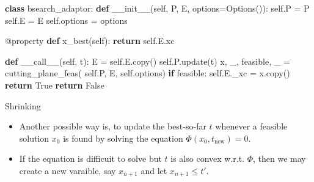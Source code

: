 \documentclass[
  ignorenonframetext,
  aspectratio=169,
  serif,onlymath]{beamer}
\newenvironment{Shaded}{}{}
\newcommand{\AttributeTok}[1]{\textcolor[rgb]{0.49,0.56,0.16}{#1}}
\newcommand{\ControlFlowTok}[1]{\textcolor[rgb]{0.00,0.44,0.13}{\textbf{#1}}}
\newcommand{\FunctionTok}[1]{\textcolor[rgb]{0.02,0.16,0.49}{#1}}
\newcommand{\KeywordTok}[1]{\textcolor[rgb]{0.00,0.44,0.13}{\textbf{#1}}}
\newcommand{\NormalTok}[1]{#1}
\newcommand{\OperatorTok}[1]{\textcolor[rgb]{0.40,0.40,0.40}{#1}}
\newcommand{\VariableTok}[1]{\textcolor[rgb]{0.10,0.09,0.49}{#1}}
\begin{document}
\begin{frame}[fragile]

\scriptsize

\begin{Shaded}
\begin{Highlighting}[]
\KeywordTok{class}\NormalTok{ bsearch_adaptor:}
    \KeywordTok{def} \FunctionTok{__init__}\NormalTok{(}\VariableTok{self}\NormalTok{, P, E, options}\OperatorTok{=}\NormalTok{Options()):}
        \VariableTok{self}\NormalTok{.P }\OperatorTok{=}\NormalTok{ P}
        \VariableTok{self}\NormalTok{.E }\OperatorTok{=}\NormalTok{ E}
        \VariableTok{self}\NormalTok{.options }\OperatorTok{=}\NormalTok{ options}

    \AttributeTok{@property}
    \KeywordTok{def}\NormalTok{ x_best(}\VariableTok{self}\NormalTok{):}
        \ControlFlowTok{return} \VariableTok{self}\NormalTok{.E.xc}

    \KeywordTok{def} \FunctionTok{__call__}\NormalTok{(}\VariableTok{self}\NormalTok{, t):}
\NormalTok{        E }\OperatorTok{=} \VariableTok{self}\NormalTok{.E.copy()}
        \VariableTok{self}\NormalTok{.P.update(t)}
\NormalTok{        x, _, feasible, _ }\OperatorTok{=}\NormalTok{ cutting_plane_feas(}
            \VariableTok{self}\NormalTok{.P, E, }\VariableTok{self}\NormalTok{.options)}
        \ControlFlowTok{if}\NormalTok{ feasible:}
            \VariableTok{self}\NormalTok{.E._xc }\OperatorTok{=}\NormalTok{ x.copy()}
            \ControlFlowTok{return} \VariableTok{True}
        \ControlFlowTok{return} \VariableTok{False}
\end{Highlighting}
\end{Shaded}

\end{frame}

\begin{frame}{Shrinking}
\protect\hypertarget{shrinking}{}

\begin{itemize}
\item
  Another possible way is, to update the best-so-far \(t\) whenever a
  feasible solution \(x_0\) is found by solving the equation
  \(\Phi(x_0, t_\text{new}) = 0\).
\item
  If the equation is difficuit to solve but \(t\) is also convex w.r.t.
  \(\Phi\), then we may create a new varaible, say \(x_{n+1}\) and let
  \(x_{n+1} \le t'\).
\end{itemize}

\end{frame}
\end{document}

